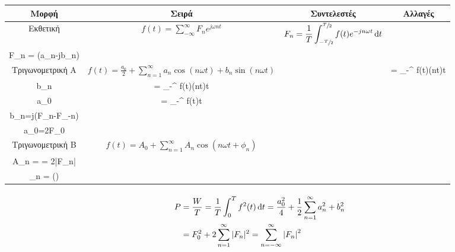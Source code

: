 \documentclass[11pt,a4paper,titlepage,fleqn]{article}
\begin{document}
	\hspace{-2cm}
	\begin{tabular}{|c|c|c|c|}
		\hline \textbf{Μορφή} & \textbf{Σειρά}  & \textbf{Συντελεστές} & \textbf{Αλλαγές} \\ 
		\hline Εκθετική & \(\displaystyle f(t)=\sum_{-\infty}^\infty F_n e^{j\omega n t} \) &
		\(\displaystyle F_n = \frac{1}{T} \int_{-\sfrac{T}{2}}^{\sfrac{T}{2}}
		f(t)e^{-jn\omega t}\dif t\) &\(
		\begin{array}{l}
			F_0 = \sfrac{a_0}{2} \\ F_n = \sfrac{1}{2} (a_n-jb_n)  
		\end{array}\)
		 \\ 
		\hline {\small Τριγωνομετρική} Α  & \( 
		\displaystyle f(t)=\frac{a_0}{2}+\sum_{n=1}^\infty a_n\cos(n\omega t)
		+b_n\sin(n\omega t)
		 \)  & \(
		 \begin{array}{ll}
		 a_n &= \frac{2}{T} \int_{-\sfrac{T}{2}}^{\sfrac{T}{2}} f(t)\cos(n\omega t)\dif t \\
		 b_n &= \frac{2}{T} \int_{-\sfrac{T}{2}}^{\sfrac{T}{2}} f(t)\sin(n\omega t)\dif t \\ a_0 &= \frac{2}{T} \int_{-\sfrac{T}{2}}^{\sfrac{T}{2}} f(t)\dif t
		 \end{array}
		 \) & 
		 \(
		 \begin{array}{l}
		 a_n = (F_n+F_{-n})\\
		 b_n=j(F_n-F_{-n})\\
		 a_0=2F_0
		 \end{array}
		 \)
		 \\ 
		\hline 
		{\small Τριγωνομετρική} Β
		& \(
		f(t) = A_0 + \sum_{n=1}^\infty A_n\cos(n\omega t+\phi_n)
		\) & &
		\(
		\begin{array}{l}
		A_0 = \sfrac{a_0}{2} \\
		A_n = \sqrt{a_n^2+b_n^2} = 2|F_n| \\
		\phi_n = \arctan\left(\frac{b_n}{a_n}\right)
		\end{array}
		\)
		\\ \hline
	\end{tabular} 
	
	\paragraph{}
	\begin{align*}
	P &= \frac{W}{T} = \frac{1}{T} \int_0^T f^2(t)\dif t =	
	\frac{a_0^2}{4}+\frac{1}{2}\sum_{n=1}^\infty a_n^2+b_n^2
	\\ &= F_0^2+2\sum_{n=1}^\infty |F_n|^2 = 
	\sum_{n=-\infty}^\infty \left|F_n\right|^2 
	\end{align*}
	
\end{document}

